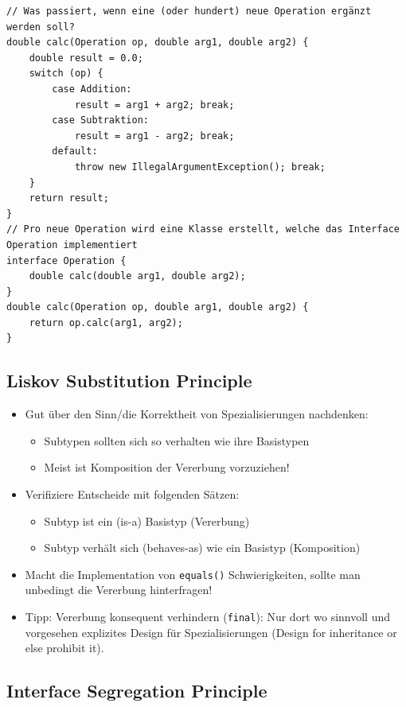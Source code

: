 \begin{lstlisting}[caption={Strategy Pattern um OCP umzusetzen},label=lst:ocp-strategy]
// Was passiert, wenn eine (oder hundert) neue Operation ergänzt werden soll?
double calc(Operation op, double arg1, double arg2) {
	double result = 0.0;
	switch (op) {
		case Addition:
			result = arg1 + arg2; break;
		case Subtraktion:
			result = arg1 - arg2; break;
		default:
			throw new IllegalArgumentException(); break;
	}
	return result;
}
// Pro neue Operation wird eine Klasse erstellt, welche das Interface Operation implementiert
interface Operation {
	double calc(double arg1, double arg2);
}
double calc(Operation op, double arg1, double arg2) {
	return op.calc(arg1, arg2);
}
\end{lstlisting}

\subsection{Liskov Substitution Principle}

\begin{itemize}
	\item Gut über den Sinn/die Korrektheit von Spezialisierungen nachdenken:
	\begin{itemize}
		\item Subtypen sollten sich so verhalten wie ihre Basistypen
		\item Meist ist Komposition der Vererbung vorzuziehen!
	\end{itemize}
	\item Verifiziere Entscheide mit folgenden Sätzen:
	 \begin{itemize}
		\item Subtyp ist ein (is-a) Basistyp (Vererbung)
		\item Subtyp verhält sich (behaves-as) wie ein Basistyp (Komposition)
	 \end{itemize}
	\item Macht die Implementation von \texttt{equals()} Schwierigkeiten, sollte man unbedingt die Vererbung hinterfragen!
	\item Tipp: Vererbung konsequent verhindern (\texttt{final}): Nur dort wo sinnvoll und vorgesehen explizites Design für Spezialisierungen (Design for inheritance or else prohibit it).
\end{itemize}

\subsection{Interface Segregation Principle}

